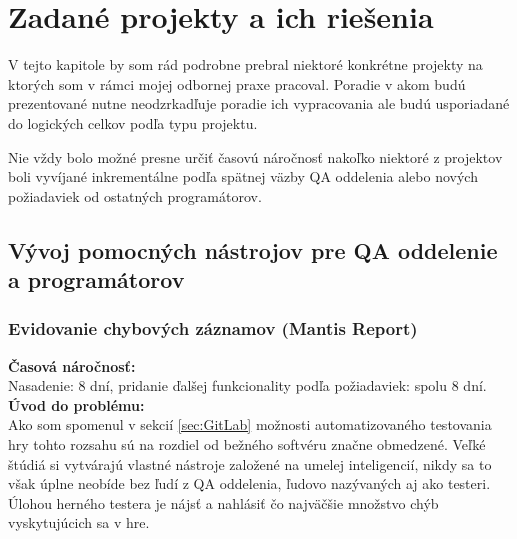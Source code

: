 \documentclass[slovak, bachelorpractice]{diploma}
\begin{document}
\chapter{Zadané projekty a ich riešenia}
\label{sec:Projects}
V tejto kapitole by som rád podrobne prebral niektoré konkrétne projekty na ktorých som v rámci mojej odbornej praxe pracoval. Poradie v akom budú prezentované nutne neodzrkadľuje poradie ich vypracovania ale budú usporiadané do logických celkov podľa typu projektu. 

Nie vždy bolo možné presne určiť časovú náročnosť nakoľko niektoré z projektov boli vyvíjané inkrementálne podľa spätnej väzby QA oddelenia alebo nových požiadaviek od ostatných programátorov.

\section{Vývoj pomocných nástrojov pre QA oddelenie a programátorov}
\label{sec:QACode}
\subsection{Evidovanie chybových záznamov (Mantis Report)}
\label{sec:Report}
\textbf{Časová náročnosť:} \\ Nasadenie: 8 dní, pridanie ďalšej funkcionality podľa požiadaviek: spolu 8 dní.\\
\textbf{Úvod do problému:} \\ Ako som spomenul v sekcií \ref{sec:GitLab} možnosti automatizovaného testovania hry tohto rozsahu sú na rozdiel od bežného softvéru značne obmedzené. Veľké štúdiá si vytvárajú vlastné nástroje založené na umelej inteligencií, nikdy sa to však úplne neobíde bez ľudí z QA oddelenia, ľudovo nazývaných aj ako testeri. Úlohou herného testera je nájsť a nahlásiť čo najväčšie množstvo chýb vyskytujúcich sa v hre. 
\end{document}
